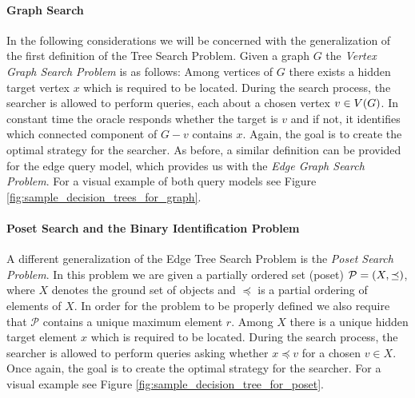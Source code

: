 \paragraph{Graph Search} In the following considerations we will be concerned with the generalization of the first definition of the Tree Search Problem. Given a graph $G$ the \textit{Vertex Graph Search Problem} is as follows: Among vertices of $G$ there exists a hidden target vertex $x$ which is required to be located. During the search process, the searcher is allowed to perform queries, each about a chosen vertex $v\in V\mathopen{}\left( G \right)$. In constant time the oracle responds whether the target is $v$ and if not, it identifies which connected component of $G-v$ contains $x$. Again, the goal is to create the optimal strategy for the searcher. As before, a similar definition can be provided for the edge query model, which provides us with the \textit{Edge Graph Search Problem}. For a visual example of both query models see Figure \ref{fig:sample_decision_trees_for_graph}.



\paragraph{Poset Search and the Binary Identification Problem}
A different generalization of the Edge Tree Search Problem is the \textit{Poset Search Problem}. In this problem we are given a partially ordered set (poset) $\mathcal{P}=\mathopen{}\left( X, \preceq \right)$, where $X$ denotes the ground set of objects and $\preceq$ is a partial ordering of elements of $X$. In order for the problem to be properly defined we also require that $\mathcal{P}$ contains a unique maximum element $r$. Among $X$ there is a unique hidden target element $x$ which is required to be located. During the search process, the searcher is allowed to perform queries asking whether $x\preceq v$ for a chosen $v\in X$. Once again, the goal is to create the optimal strategy for the searcher. For a visual example see Figure \ref{fig:sample_decision_tree_for_poset}.


